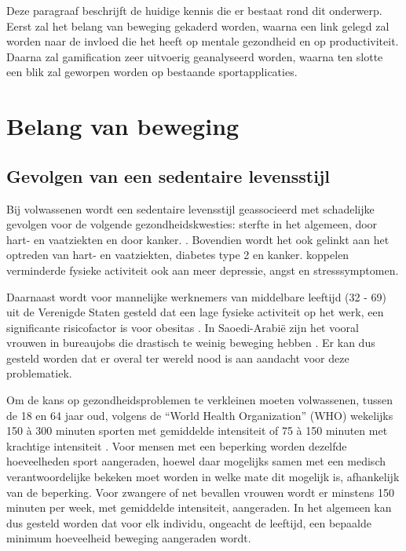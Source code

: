 Deze paragraaf beschrijft de huidige kennis die er bestaat rond dit onderwerp. Eerst zal het belang van beweging gekaderd worden, waarna een link gelegd zal worden naar de invloed die het heeft op mentale gezondheid en op productiviteit. Daarna zal gamification zeer uitvoerig geanalyseerd worden, waarna ten slotte een blik zal geworpen worden op bestaande sportapplicaties.

\section{Belang van beweging}

\subsection{Gevolgen van een sedentaire levensstijl}
Bij volwassenen wordt een sedentaire levensstijl geassocieerd met schadelijke gevolgen voor de volgende gezondheidskwesties: sterfte in het algemeen, door hart- en vaatziekten en door kanker. \autocite{Bull2020}. Bovendien wordt het ook gelinkt aan het optreden van hart- en vaatziekten, diabetes type 2 en kanker. \textcite{Stanton2020} koppelen verminderde fysieke activiteit ook aan meer depressie, angst en stresssymptomen.

Daarnaast wordt voor mannelijke werknemers van middelbare leeftijd (32 - 69) uit de Verenigde Staten gesteld dat een lage fysieke activiteit op het werk, een significante risicofactor is voor obesitas \autocite{Choi2010}. In Saoedi-Arabië zijn het vooral vrouwen in bureaujobs die drastisch te weinig beweging hebben \autocite{Albawardi2017}. Er kan dus gesteld worden dat er overal ter wereld nood is aan aandacht voor deze problematiek.

Om de kans op gezondheidsproblemen te verkleinen moeten volwassenen, tussen de 18 en 64 jaar oud, volgens de ``World Health Organization'' (WHO) wekelijks 150 à 300 minuten sporten met gemiddelde intensiteit of 75 à 150 minuten met krachtige intensiteit \autocite{Bull2020}. Voor mensen met een beperking worden dezelfde hoeveelheden sport aangeraden, hoewel daar mogelijks samen met een medisch verantwoordelijke bekeken moet worden in welke mate dit mogelijk is, afhankelijk van de beperking. Voor zwangere of net bevallen vrouwen wordt er minstens 150 minuten per week, met gemiddelde intensiteit, aangeraden. In het algemeen kan dus gesteld worden dat voor elk individu, ongeacht de leeftijd, een bepaalde minimum hoeveelheid beweging aangeraden wordt.

